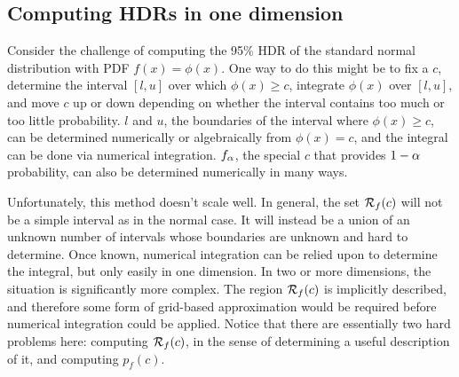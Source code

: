 \subsection{Computing HDRs in one dimension}\label{sec:hdr1d}

Consider the challenge of computing the 95\% HDR of the standard normal distribution with PDF $f(x) = \phi(x)$.
One way to do this might be to fix a $c$, determine the interval $[l,u]$ over which $\phi(x) \geq c$, integrate $\phi(x)$ over $[l,u]$, and move $c$ up or down depending on whether the interval contains too much or too little probability.
$l$ and $u$, the boundaries of the interval where $\phi(x) \geq c$, can be determined numerically or algebraically from $\phi(x) = c$, and the integral can be done via numerical integration.
$f_{\alpha}$, the special $c$ that provides $1 - \alpha$ probability, can also be determined numerically in many ways.

Unfortunately, this method doesn't scale well.
In general, the set $\mathcal{R}_{f}(c)$ will not be a simple interval as in the normal case.
It will instead be a union of an unknown number of intervals whose boundaries are unknown and hard to determine.
Once known, numerical integration can be relied upon to determine the integral, but only easily in one dimension.
In two or more dimensions, the situation is significantly more complex.
The region $\mathcal{R}_{f}(c)$ is implicitly described, and therefore some form of grid-based approximation would be required before numerical integration could be applied.
Notice that there are essentially two hard problems here: computing $\mathcal{R}_{f}(c)$, in the sense of determining a useful description of it, and computing $p_{f}(c)$.


